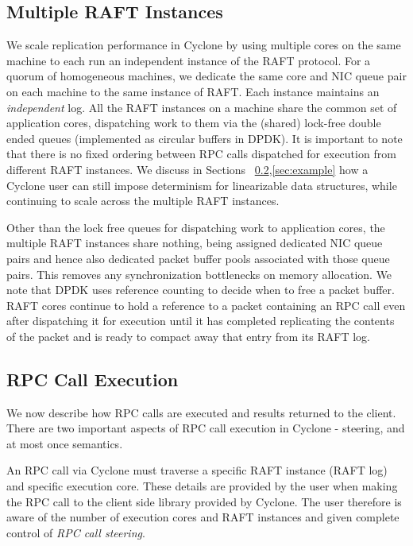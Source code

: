 \documentclass[twocolumn]{article}
\begin{document}
\subsection{Multiple RAFT Instances}
\label{sec:ind}
We scale replication performance in Cyclone by using multiple cores on the same
machine to each run an independent instance of the RAFT protocol. For a quorum
of homogeneous machines, we dedicate the same core and NIC queue pair on each
machine to the same instance of RAFT. Each instance maintains an
\emph{independent} log. All the RAFT instances on a machine share the common set
of application cores, dispatching work to them via the (shared) lock-free double
ended queues (implemented as circular buffers in DPDK). It is important to note
that there is no fixed ordering between RPC calls dispatched for execution from
different RAFT instances. We discuss in Sections
~\ref{sec:exec},\ref{sec:example} how a Cyclone user can still impose
determinism for linearizable data structures, while continuing to scale across
the multiple RAFT instances.

Other than the lock free queues for dispatching work to application cores, the
multiple RAFT instances share nothing, being assigned dedicated NIC queue pairs
and hence also dedicated packet buffer pools associated with those queue
pairs. This removes any synchronization bottlenecks on memory allocation. We
note that DPDK uses reference counting to decide when to free a packet
buffer. RAFT cores continue to hold a reference to a packet containing an RPC
call even after dispatching it for execution until it has completed replicating
the contents of the packet and is ready to compact away that entry from its RAFT
log.

\subsection{RPC Call Execution}
\label{sec:exec}
We now describe how RPC calls are executed and results returned to the
client. There are two important aspects of RPC call execution in Cyclone -
steering, and at most once semantics.

An RPC call via Cyclone must traverse a specific RAFT instance (RAFT log) and
specific execution core. These details are provided by the user when making the
RPC call to the client side library provided by Cyclone. The user therefore is
aware of the number of execution cores and RAFT instances and given complete
control of \emph{RPC call steering}.
\end{document}
